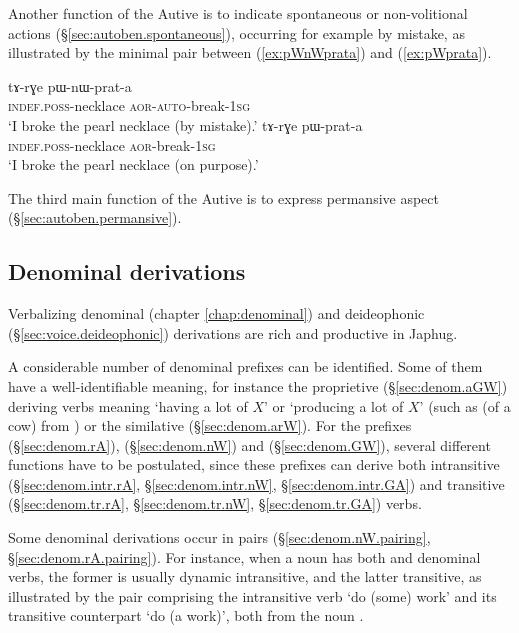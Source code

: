 Another function of the Autive is to indicate spontaneous or non-volitional actions (§\ref{sec:autoben.spontaneous}), occurring for example by mistake, as illustrated by the minimal pair between (\ref{ex:pWnWprata}) and (\ref{ex:pWprata}).


\begin{exe}
\ex 
\begin{xlist}
\ex \label{ex:pWnWprata}
\gll tɤ-rɣe pɯ-nɯ-prat-a  \\
\textsc{indef}.\textsc{poss}-necklace \textsc{aor}-\textsc{auto}-break-\textsc{1sg}  \\
\glt `I broke the pearl necklace (by mistake).'
\ex \label{ex:pWprata}
\gll tɤ-rɣe pɯ-prat-a  \\
\textsc{indef}.\textsc{poss}-necklace \textsc{aor}-break-\textsc{1sg}  \\
\glt `I broke the pearl necklace (on purpose).' 
\end{xlist} 
\end{exe}

The third main function of the Autive is to express permansive aspect (§\ref{sec:autoben.permansive}).

\subsection{Denominal derivations}
Verbalizing denominal (chapter \ref{chap:denominal}) and deideophonic (§\ref{sec:voice.deideophonic}) derivations are rich and productive in Japhug. 

A considerable number of denominal prefixes can be identified. Some of them have a well-identifiable meaning, for instance the proprietive  (§\ref{sec:denom.aGW}) deriving verbs meaning `having a lot of $X$' or `producing a lot of $X$' (such as  (of a cow) from ) or the similative  (§\ref{sec:denom.arW}). For the prefixes  (§\ref{sec:denom.rA}),  (§\ref{sec:denom.nW}) and   (§\ref{sec:denom.GW}), several different functions have to be postulated, since these prefixes can derive both intransitive (§\ref{sec:denom.intr.rA}, §\ref{sec:denom.intr.nW}, §\ref{sec:denom.intr.GA}) and transitive (§\ref{sec:denom.tr.rA}, §\ref{sec:denom.tr.nW}, §\ref{sec:denom.tr.GA}) verbs.

Some denominal derivations occur in pairs (§\ref{sec:denom.nW.pairing}, §\ref{sec:denom.rA.pairing}). For instance, when a noun has both  and  denominal verbs, the former is usually dynamic intransitive, and the latter transitive, as illustrated by the pair comprising the intransitive verb  `do (some) work' and its transitive counterpart  `do (a work)', both from the noun .

